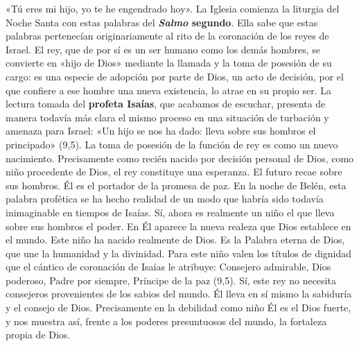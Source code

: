 \documentclass[]{article}
\begin{document}
«Tú eres mi hijo, yo te he engendrado hoy». La Iglesia comienza la
liturgia del Noche Santa con estas palabras del \textbf{\emph{Salmo}
segundo}. Ella sabe que estas palabras pertenecían originariamente al
rito de la coronación de los reyes de Israel. El rey, que de por sí es
un ser humano como los demás hombres, se convierte en «hijo de Dios»
mediante la llamada y la toma de posesión de su cargo: es una especie de
adopción por parte de Dios, un acto de decisión, por el que confiere a
ese hombre una nueva existencia, lo atrae en su propio ser. La lectura
tomada del \textbf{profeta Isaías}, que acabamos de escuchar, presenta
de manera todavía más clara el mismo proceso en una situación de
turbación y amenaza para Israel: «Un hijo se nos ha dado: lleva sobre
sus hombros el principado» (9,5). La toma de posesión de la función de
rey es como un nuevo nacimiento. Precisamente como recién nacido por
decisión personal de Dios, como niño procedente de Dios, el rey
constituye una esperanza. El futuro recae sobre sus hombros. Él es el
portador de la promesa de paz. En la noche de Belén, esta palabra
profética se ha hecho realidad de un modo que habría sido todavía
inimaginable en tiempos de Isaías. Sí, ahora es realmente un niño el que
lleva sobre sus hombros el poder. En Él aparece la nueva realeza que
Dios establece en el mundo. Este niño ha nacido realmente de Dios. Es la
Palabra eterna de Dios, que une la humanidad y la divinidad. Para este
niño valen los títulos de dignidad que el cántico de coronación de
Isaías le atribuye: Consejero admirable, Dios poderoso, Padre por
siempre, Príncipe de la paz (9,5). Sí, este rey no necesita consejeros
provenientes de los sabios del mundo. Él lleva en sí mismo la sabiduría
y el consejo de Dios. Precisamente en la debilidad como niño Él es el
Dios fuerte, y nos muestra así, frente a los poderes presuntuosos del
mundo, la fortaleza propia de Dios.
\end{document}
